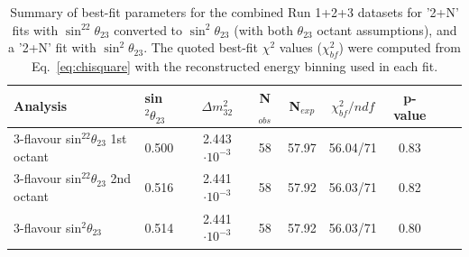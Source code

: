 %
\begin{table}
\centering
\begin{tabular}{| l | l | c | c | c  c | c | c | c |}
\hline
Analysis & sin$^2\theta_{23}$ & $\Delta m_{32}^2$ & N$_{obs}$ & N$_{exp}$ & $\chi^2_{bf} / ndf$ & p-value \\
\hline
3-flavour sin$^22\theta_{23}$ 1st octant & 0.500 &  2.443 $\cdot 10^{-3}$ & 58 & 57.97 & 56.04/71 & 0.83 \\
3-flavour sin$^22\theta_{23}$ 2nd octant & 0.516 &  2.441 $\cdot 10^{-3}$ & 58 & 57.92 & 56.03/71 & 0.82 \\
3-flavour sin$^2\theta_{23}$             & 0.514 &  2.441 $\cdot 10^{-3}$ & 58 & 57.92 & 56.03/71 & 0.80 \\
\hline
\end{tabular}
\caption{
  Summary of best-fit parameters for the combined Run 1+2+3 datasets
  for '2+N' fits with $\sin^22\theta_{23}$ converted to $\sin^2\theta_{23}$ (with both $\theta_{23}$ octant assumptions),
  and a '2+N' fit with $\sin^2\theta_{23}$.
  The quoted best-fit $\chi^2$ values ($\chi^2_{bf}$) were computed from Eq.\ \ref{eq:chisquare} 
  with the reconstructed energy binning used in each fit.
}
\label{tab:bestfit_sinsqtheta}
\end{table}

